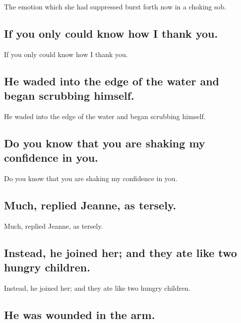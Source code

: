 \documentclass[]{article}
\begin{document}
The emotion which she had suppressed burst forth now in a choking sob.

\hypertarget{if-you-only-could-know-how-i-thank-you.}{%
\subsection{If you only could know how I thank
you.}\label{if-you-only-could-know-how-i-thank-you.}}

If you only could know how I thank you.

\hypertarget{he-waded-into-the-edge-of-the-water-and-began-scrubbing-himself.}{%
\subsection{He waded into the edge of the water and began scrubbing
himself.}\label{he-waded-into-the-edge-of-the-water-and-began-scrubbing-himself.}}

He waded into the edge of the water and began scrubbing himself.

\hypertarget{do-you-know-that-you-are-shaking-my-confidence-in-you.}{%
\subsection{Do you know that you are shaking my confidence in
you.}\label{do-you-know-that-you-are-shaking-my-confidence-in-you.}}

Do you know that you are shaking my confidence in you.

\hypertarget{much-replied-jeanne-as-tersely.}{%
\subsection{Much, replied Jeanne, as
tersely.}\label{much-replied-jeanne-as-tersely.}}

Much, replied Jeanne, as tersely.

\hypertarget{instead-he-joined-her-and-they-ate-like-two-hungry-children.}{%
\subsection{Instead, he joined her; and they ate like two hungry
children.}\label{instead-he-joined-her-and-they-ate-like-two-hungry-children.}}

Instead, he joined her; and they ate like two hungry children.

\hypertarget{he-was-wounded-in-the-arm.}{%
\subsection{He was wounded in the
arm.}\label{he-was-wounded-in-the-arm.}}
\end{document}
